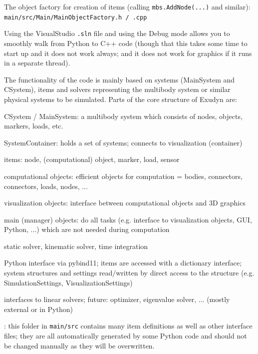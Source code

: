   \item The object factory for creation of items (calling \texttt{mbs.AddNode(...)} and similar): \\
    \texttt{main/src/Main/MainObjectFactory.h / .cpp}
  \item Using the VisualStudio \texttt{.sln} file and using the Debug mode allows you to smoothly walk from Python to C++ code (though that this takes some time to start up and it does not work always; and it does not work for graphics if it runs in a separate thread).
\ei

The functionality of the code is mainly based on systems (MainSystem and CSystem), items and solvers representing the multibody system or similar physical systems to be simulated. Parts of the core structure of Exudyn are:
\bi
  \item CSystem / MainSystem: a multibody system which consists of nodes, objects, markers, loads, etc.
  \item SystemContainer: holds a set of systems; connects to visualization (container)
  \item items: node, (computational) object, marker, load, sensor
  \item computational objects: efficient objects for computation = bodies, connectors, connectors, loads, nodes, ...
  \item visualization objects: interface between computational objects and 3D graphics
  \item main (manager) objects: do all tasks (e.g. interface to visualization objects, GUI, Python, ...) which are not needed during computation
  \item static solver, kinematic solver, time integration
  \item Python interface via pybind11; items are accessed with a dictionary interface; system structures and settings read/written by direct access to the structure (e.g. SimulationSettings, VisualizationSettings)
  \item interfaces to linear solvers; future: optimizer, eigenvalue solver, ... (mostly external or in Python)
  \item {}: this folder in \texttt{main/src} contains many item definitions as well as other interface files; they are all automatically generated by some Python code and should not be changed manually as they will be overwritten.
\ei


